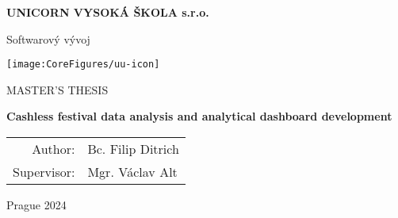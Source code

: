\pagestyle{empty}
\begin{center}

{\bfseries\large UNICORN VYSOKÁ ŠKOLA s.r.o.}

    \vspace{5mm}

    {\Large Softwarový vývoj}

    \vfill
    \vspace{5mm}

    \centerline{\mbox{\texttt{[image: \\CoreFigures/uu-icon]}}}

    \vfill
    \vspace{5mm}

    {\large\MakeUppercase{Master's Thesis}}

    \vspace{15mm}

    {\LARGE\bfseries Cashless festival data analysis and analytical dashboard development}

    \vfill

    \begin{tabular}{rl}
        Author: & Bc. Filip Ditrich \\
        \noalign{\vspace{2mm}}
        Supervisor: & Mgr. Václav Alt \\
    \end{tabular}

    \vfill

    Prague 2024

\end{center}
